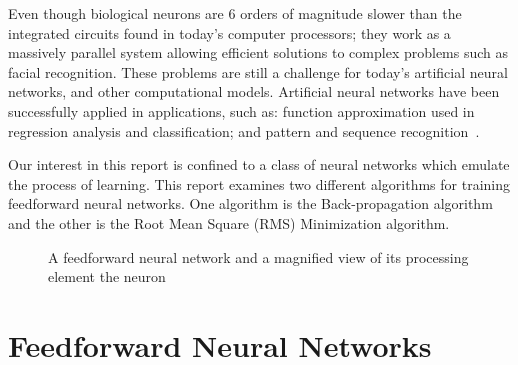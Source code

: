 \documentclass[11pt]{article}
\begin{document}
Even though biological neurons are 6 orders of magnitude slower than the integrated circuits found in today's computer processors; they
work as a massively parallel system allowing efficient solutions to complex problems such as facial recognition. These problems are
still a challenge for today's artificial neural networks, and other computational models. Artificial neural networks have been
successfully applied in applications, such as: function approximation used in regression analysis and classification; and pattern and
sequence recognition~\cite{skapura}.

Our interest in this report is confined to a class of neural networks which emulate the process of learning. This report examines two
different algorithms for training feedforward neural networks. One algorithm is the Back-propagation algorithm and the other is the Root
Mean Square (RMS) Minimization algorithm.

\begin{figure}[]
	\centering
		\hspace{2mm} 
		\caption{A feedforward neural network and a magnified view of its processing element the neuron }
	\label{fig:figures_ffwdnn_Neuron}	
\end{figure}

\section{Feedforward Neural Networks} %
\label{sec:feedforward_neural_networks}
\end{document}
